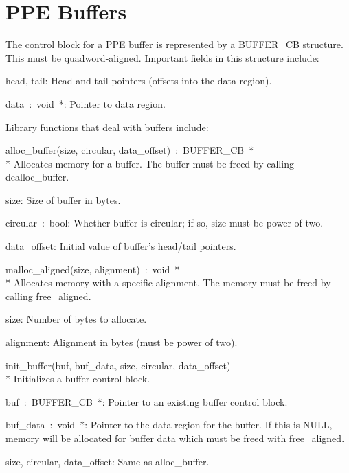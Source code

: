 \section{PPE Buffers}

The control block for a PPE buffer is represented by a \textsf{BUFFER\_CB} structure. This must be quadword-aligned. Important fields in this structure include:
\begin{description}
\item \textsf{head, tail}: Head and tail pointers (offsets into the data region).
\item \textsf{data~:~void~*}: Pointer to data region.
\end{description}

Library functions that deal with buffers include:
\begin{description}
\item \textsf{alloc\_buffer(size, circular, data\_offset)~:~BUFFER\_CB~*} \\*
Allocates memory for a buffer. The buffer must be freed by calling \textsf{dealloc\_buffer}.
\begin{description}
\item \textsf{size}: Size of buffer in bytes.
\item \textsf{circular~:~bool}: Whether buffer is circular; if so, \textsf{size} must be power of two.
\item \textsf{data\_offset}: Initial value of buffer's head/tail pointers.
\end{description}

\item \textsf{malloc\_aligned(size, alignment)~:~void~*} \\*
Allocates memory with a specific alignment. The memory must be freed by calling \textsf{free\_aligned}.
\begin{description}
\item \textsf{size}: Number of bytes to allocate.
\item \textsf{alignment}: Alignment in bytes (must be power of two).
\end{description}

\item \textsf{init\_buffer(buf, buf\_data, size, circular, data\_offset)} \\*
Initializes a buffer control block.
\begin{description}
\item \textsf{buf~:~BUFFER\_CB~*}: Pointer to an existing buffer control block.
\item \textsf{buf\_data~:~void~*}: Pointer to the data region for the buffer. If this is \textsf{NULL}, memory will be allocated for buffer data which must be freed with \textsf{free\_aligned}.
\item \textsf{size, circular, data\_offset}: Same as \textsf{alloc\_buffer}.
\end{description}


\end{description}
